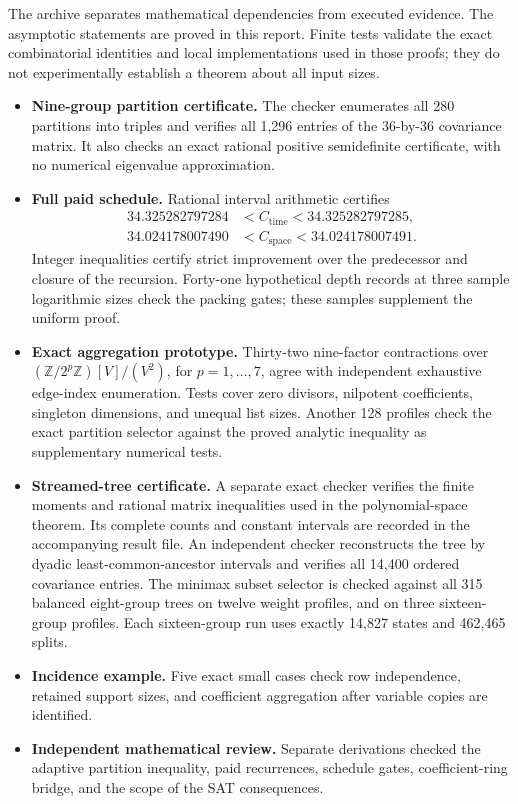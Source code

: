 \documentclass[11pt,letterpaper]{article}
\theoremstyle{remark}\newtheorem{remark}[theorem]{Remark}
\newcommand{\CT}{C_{\mathrm{time}}}
\newcommand{\CS}{C_{\mathrm{space}}}
\begin{document}
The archive separates mathematical dependencies from executed evidence.
The asymptotic statements are proved in this report. Finite tests validate
the exact combinatorial identities and local implementations used in those
proofs; they do not experimentally establish a theorem about all input
sizes.

\begin{itemize}[leftmargin=1.6em]
\item \textbf{Nine-group partition certificate.} The checker enumerates all
280 partitions into triples and verifies all 1,296 entries of the
36-by-36 covariance matrix. It also checks an exact rational positive
semidefinite certificate, with no numerical eigenvalue approximation.
\item \textbf{Full paid schedule.} Rational interval arithmetic certifies
\begin{align*}
34.325282797284&<\CT<34.325282797285,\\
34.024178007490&<\CS<34.024178007491.
\end{align*}
Integer inequalities certify strict
improvement over the predecessor and closure of the recursion. Forty-one
hypothetical depth records at three sample logarithmic sizes check the
packing gates; these samples supplement the uniform proof.
\item \textbf{Exact aggregation prototype.} Thirty-two nine-factor
contractions over $(\mathbb Z/2^p\mathbb Z)[V]/(V^2)$, for $p=1,\ldots,7$,
agree with independent exhaustive edge-index enumeration. Tests cover
zero divisors, nilpotent coefficients, singleton dimensions, and unequal
list sizes. Another 128 profiles check the exact partition selector
against the proved analytic inequality as supplementary numerical tests.
\item \textbf{Streamed-tree certificate.} A separate exact checker verifies
the finite moments and rational matrix inequalities used in the
polynomial-space theorem. Its complete counts and constant intervals
are recorded in the accompanying result file. An independent checker
reconstructs the tree by dyadic least-common-ancestor intervals and verifies
all 14,400 ordered covariance entries. The minimax subset selector is
checked against all 315 balanced eight-group trees on twelve weight
profiles, and on three sixteen-group profiles. Each sixteen-group run
uses exactly 14,827 states and 462,465 splits.
\item \textbf{Incidence example.} Five exact small cases check row
independence, retained support sizes, and coefficient aggregation after
variable copies are identified.
\item \textbf{Independent mathematical review.} Separate derivations
checked the adaptive partition inequality, paid recurrences, schedule
gates, coefficient-ring bridge, and the scope of the SAT consequences.
\end{itemize}
\end{document}
